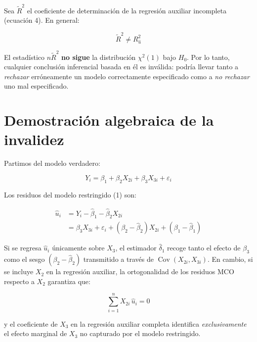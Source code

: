 \documentclass[12pt,letterpaper]{article}
\newcommand{\Cov}{\operatorname{Cov}}
\begin{document}
Sea $\tilde{R}^{2}$ el coeficiente de determinación de la regresión
auxiliar incompleta (ecuación 4). En general:

\begin{equation}
\tilde{R}^{2} \neq R^{2}_{\hat{u}}
\end{equation}

El estadístico $n\tilde{R}^{2}$ \textbf{no sigue} la distribución
$\chi^{2}(1)$ bajo $H_{0}$. Por lo tanto, cualquier conclusión
inferencial basada en él es inválida: podría llevar tanto a
\emph{rechazar} erróneamente un modelo correctamente especificado
como a \emph{no rechazar} uno mal especificado.

\section{Demostración algebraica de la invalidez}

Partimos del modelo verdadero:

\begin{equation}
Y_{i} = \beta_{1} + \beta_{2} X_{2i} + \beta_{3} X_{3i} + \varepsilon_{i}
\end{equation}

Los residuos del modelo restringido (1) son:

\begin{align}
\hat{u}_{i}
&= Y_{i} - \hat{\beta}_{1} - \hat{\beta}_{2} X_{2i} \\[4pt]
&= \beta_{3} X_{3i} + \varepsilon_{i}
   + (\beta_{2} - \hat{\beta}_{2}) X_{2i}
   + (\beta_{1} - \hat{\beta}_{1})
\end{align}

Si se regresa $\hat{u}_{i}$ únicamente sobre $X_{3}$, el estimador
$\hat{\delta}_{1}$ recoge tanto el efecto de $\beta_{3}$ como el
sesgo $(\beta_{2} - \hat{\beta}_{2})$ transmitido a través de
$\Cov(X_{2i}, X_{3i})$. En cambio, si se incluye $X_{2}$ en la
regresión auxiliar, la ortogonalidad de los residuos MCO respecto
a $X_{2}$ garantiza que:

\begin{equation}
\sum_{i=1}^{n} X_{2i}\,\hat{u}_{i} = 0
\end{equation}

y el coeficiente de $X_{3}$ en la regresión auxiliar completa
identifica \emph{exclusivamente} el efecto marginal de $X_{3}$ no
capturado por el modelo restringido.
\end{document}

